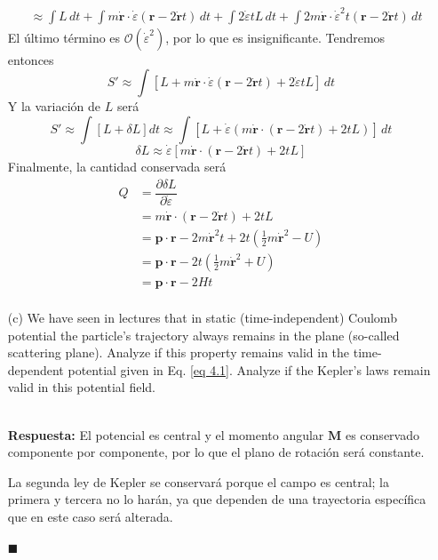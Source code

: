\documentclass[]{article}
\numberwithin{equation}{section}
\newcommand{\0}{\textcolor{gray}{0}}
\newcommand{\rv}{\mathbf{r}}
\newcommand{\pv}{\mathbf{p}}
\newcommand{\pd}[2]{\dfrac{\partial #1}{\partial #2}}
\newcommand{\n}[1]{\mathbf{#1}}
\newcommand{\qed}{\hfill\(\blacksquare\)}
\newcommand{\resp}{
	\\
	
	\textbf{Respuesta:} }
\begin{document}
\begin{enumerate}
\begin{align*}
		&\approx \int L \, dt + \int m \dot{\rv} \cdot \dot{\varepsilon} \left(\rv - 2 \dot{\rv} t\right) \, dt + \int 2 \dot{\varepsilon} t L \, dt + \int 2 m \dot{\rv} \cdot \dot{\varepsilon}^2 t \left(\rv - 2 \dot{\rv} t\right) \, dt
	\end{align*}
	El último término es $\mathcal{O}(\dot{\varepsilon}^2)$, por lo que es insignificante. Tendremos entonces
	\begin{equation*}
		S' \approx \int \left[L + m \dot{\rv} \cdot \dot{\varepsilon} \left(\rv - 2 \dot{\rv} t\right) + 2 \dot{\varepsilon} t L\right] \, dt
	\end{equation*}
	Y la variación de $L$ será
	\begin{equation*}
		S' \approx \int \left[L + \delta L\right] dt \approx \int \left[L + \dot{\varepsilon} \left( m \dot{\rv} \cdot \left(\rv - 2 \dot{\rv} t\right) + 2 t L\right)\right] \, dt
	\end{equation*}
	\begin{equation*}
		\delta L \approx \dot{\varepsilon}\left[ m \dot{\rv} \cdot \left(\rv - 2 \dot{\rv} t\right) + 2 t L\right]
	\end{equation*}
	Finalmente, la cantidad conservada será
	\begin{align*}
		Q &= \pd{\delta L}{\dot{\varepsilon}}\\
		&= m \dot{\rv} \cdot \left(\rv - 2 \dot{\rv} t\right) + 2 t L\\
		&= \pv \cdot \rv - 2 m \dot{\rv}^2 t + 2 t \left(\frac{1}{2}m \dot{\rv}^2 - U\right)\\
		&= \pv \cdot \rv - 2 t \left(\frac{1}{2}m \dot{\rv}^2 + U\right)\\
		&= \pv \cdot \rv - 2 H t\\
	\end{align*}
	
	\item[(c)] We have seen in lectures that in static (time-independent) Coulomb potential the particle's trajectory always remains in the plane (so-called scattering plane). Analyze if this property remains valid in the time-dependent potential given in Eq. \ref{eq 4.1}. Analyze if the Kepler’s laws remain valid in this potential field.
	\resp El potencial es central y el momento angular $\n{M}$ es conservado componente por componente, por lo que el plano de rotación será constante.
	
	La segunda ley de Kepler se conservará porque el campo es central; la primera y tercera no lo harán, ya que dependen de una trayectoria específica que en este caso será alterada.
	
	\qed
\end{enumerate}
\end{document}
